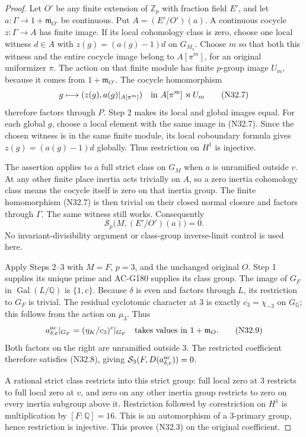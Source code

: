 \begin{proof}
Let $O'$ be any finite extension of $\mathbb Z_p$ with fraction
field $E'$, and let $a:\Gamma\to1+\mathfrak m_{O'}$ be continuous.
Put $A=(E'/O')(a)$.  A continuous cocycle $z:\Gamma\to A$
has finite image.  If its local cohomology class is zero, choose
one local witness $d\in A$ with $z(g)=(a(g)-1)d$ on $G_{M_v}$.
Choose $m$ so that both this witness and the entire cocycle image
belong to $A[\pi^m]$, for an original uniformizer $\pi$.
The action on that finite module has finite $p$-group image $U_m$,
because it comes from $1+\mathfrak m_{O'}$.
The cocycle homomorphism
\[
       g\longmapsto (z(g),a(g)|_{A[\pi^m]})
                \quad\hbox{in }A[\pi^m]\rtimes U_m
 \tag{N32.7}
\]
therefore factors through $P$.
Step 2 makes its local and global images equal.
For each global $g$, choose a local element with the same image
in (N32.7).  Since the chosen witness is in the same finite
module, its local coboundary formula gives
$z(g)=(a(g)-1)d$ globally.  Thus restriction on $H^1$ is injective.

The assertion applies to a full strict class on $G_M$ when $a$
is unramified outside $v$.
At any other finite place inertia acts trivially on $A$, so a
zero inertia cohomology class means the cocycle itself is zero
on that inertia group.  The finite homomorphism (N32.7) is then
trivial on their closed normal closure and factors through
$\Gamma$.  The same witness still works.  Consequently
\[
 \mathcal S_p\bigl(M,(E'/O')(a)\bigr)=0.
 \tag{N32.8}
\]
No invariant-divisibility argument or class-group inverse-limit
control is used here.

Apply Steps 2--3 with $M=F$, $p=3$, and the unchanged original $O$.
Step 1 supplies its unique prime and AC-G180 supplies its class group.
The image of $G_F$ in $\operatorname{Gal}(L/\mathbb Q)$ is
$\{1,c\}$.  Because $\delta$ is even and factors through $L$,
its restriction to $G_F$ is trivial.
The residual cyclotomic character at $3$ is exactly
$\overline{c_3}=\chi_{-3}$ on $G_{\mathbb Q}$; this follows from
the action on $\mu_3$.  Thus
\[
 a_{\delta,e}^{\rm nc}|_{G_F}
             = (\eta_K/c_3)^e|_{G_F}
             \quad\hbox{takes values in }1+\mathfrak m_O.
 \tag{N32.9}
\]
Both factors on the right are unramified outside $3$.
The restricted coefficient therefore satisfies (N32.8), giving
$\mathcal S_3(F,D(a_{\delta,e}^{\rm nc}))=0$.

A rational strict class restricts into this strict group:
full local zero at $3$ restricts to full local zero at $v$,
and zero on any other inertia group restricts to zero on every
inertia subgroup above it.  Restriction followed by corestriction
on $H^1$ is multiplication by $[F:\mathbb Q]=16$.
This is an automorphism of a $3$-primary group, hence restriction
is injective.  This proves (N32.3) on the original coefficient.


\end{proof}
